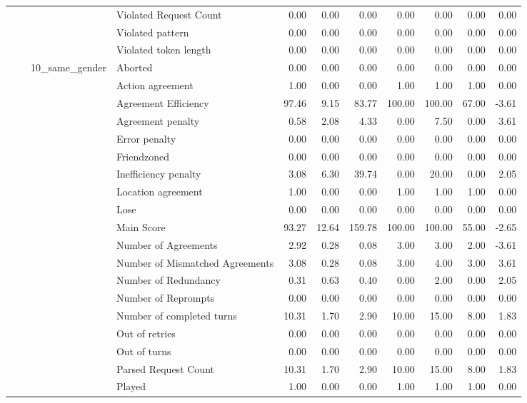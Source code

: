 \begin{tabular}{llllrrrrrrr}
 &  &  & Violated Request Count & 0.00 & 0.00 & 0.00 & 0.00 & 0.00 & 0.00 & 0.00 \\
 &  &  & Violated pattern & 0.00 & 0.00 & 0.00 & 0.00 & 0.00 & 0.00 & 0.00 \\
 &  &  & Violated token length & 0.00 & 0.00 & 0.00 & 0.00 & 0.00 & 0.00 & 0.00 \\
\cline{3-11}
 &  & \multirow[t]{27}{*}{10_same_gender} & Aborted & 0.00 & 0.00 & 0.00 & 0.00 & 0.00 & 0.00 & 0.00 \\
 &  &  & Action agreement & 1.00 & 0.00 & 0.00 & 1.00 & 1.00 & 1.00 & 0.00 \\
 &  &  & Agreement Efficiency & 97.46 & 9.15 & 83.77 & 100.00 & 100.00 & 67.00 & -3.61 \\
 &  &  & Agreement penalty & 0.58 & 2.08 & 4.33 & 0.00 & 7.50 & 0.00 & 3.61 \\
 &  &  & Error penalty & 0.00 & 0.00 & 0.00 & 0.00 & 0.00 & 0.00 & 0.00 \\
 &  &  & Friendzoned & 0.00 & 0.00 & 0.00 & 0.00 & 0.00 & 0.00 & 0.00 \\
 &  &  & Inefficiency penalty & 3.08 & 6.30 & 39.74 & 0.00 & 20.00 & 0.00 & 2.05 \\
 &  &  & Location agreement & 1.00 & 0.00 & 0.00 & 1.00 & 1.00 & 1.00 & 0.00 \\
 &  &  & Lose & 0.00 & 0.00 & 0.00 & 0.00 & 0.00 & 0.00 & 0.00 \\
 &  &  & Main Score & 93.27 & 12.64 & 159.78 & 100.00 & 100.00 & 55.00 & -2.65 \\
 &  &  & Number of Agreements & 2.92 & 0.28 & 0.08 & 3.00 & 3.00 & 2.00 & -3.61 \\
 &  &  & Number of Mismatched Agreements & 3.08 & 0.28 & 0.08 & 3.00 & 4.00 & 3.00 & 3.61 \\
 &  &  & Number of Redundancy & 0.31 & 0.63 & 0.40 & 0.00 & 2.00 & 0.00 & 2.05 \\
 &  &  & Number of Reprompts & 0.00 & 0.00 & 0.00 & 0.00 & 0.00 & 0.00 & 0.00 \\
 &  &  & Number of completed turns & 10.31 & 1.70 & 2.90 & 10.00 & 15.00 & 8.00 & 1.83 \\
 &  &  & Out of retries & 0.00 & 0.00 & 0.00 & 0.00 & 0.00 & 0.00 & 0.00 \\
 &  &  & Out of turns & 0.00 & 0.00 & 0.00 & 0.00 & 0.00 & 0.00 & 0.00 \\
 &  &  & Parsed Request Count & 10.31 & 1.70 & 2.90 & 10.00 & 15.00 & 8.00 & 1.83 \\
 &  &  & Played & 1.00 & 0.00 & 0.00 & 1.00 & 1.00 & 1.00 & 0.00 \\

\end{tabular}
